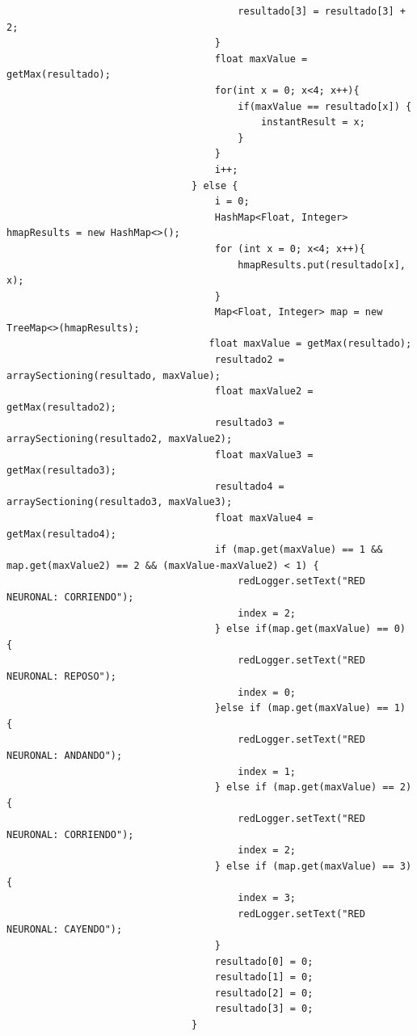\documentclass[12pt]{book}
\numberwithin{equation}{section}
\begin{document}
\begin{appendices}
\begin{verbatim}
                                        resultado[3] = resultado[3] + 2;
                                    }
                                    float maxValue = getMax(resultado);
                                    for(int x = 0; x<4; x++){
                                        if(maxValue == resultado[x]) {
                                            instantResult = x;
                                        }
                                    }
                                    i++;
                                } else {
                                    i = 0;
                                    HashMap<Float, Integer> hmapResults = new HashMap<>();
                                    for (int x = 0; x<4; x++){
                                        hmapResults.put(resultado[x], x);
                                    }
                                    Map<Float, Integer> map = new TreeMap<>(hmapResults);
                                   float maxValue = getMax(resultado);
                                    resultado2 = arraySectioning(resultado, maxValue);
                                    float maxValue2 = getMax(resultado2);
                                    resultado3 = arraySectioning(resultado2, maxValue2);
                                    float maxValue3 = getMax(resultado3);
                                    resultado4 = arraySectioning(resultado3, maxValue3);
                                    float maxValue4 = getMax(resultado4);
                                    if (map.get(maxValue) == 1 && map.get(maxValue2) == 2 && (maxValue-maxValue2) < 1) {
                                        redLogger.setText("RED NEURONAL: CORRIENDO");
                                        index = 2;
                                    } else if(map.get(maxValue) == 0) {
                                        redLogger.setText("RED NEURONAL: REPOSO");
                                        index = 0;
                                    }else if (map.get(maxValue) == 1) {
                                        redLogger.setText("RED NEURONAL: ANDANDO");
                                        index = 1;
                                    } else if (map.get(maxValue) == 2){
                                        redLogger.setText("RED NEURONAL: CORRIENDO");
                                        index = 2;
                                    } else if (map.get(maxValue) == 3) {
                                        index = 3;
                                        redLogger.setText("RED NEURONAL: CAYENDO");
                                    }
                                    resultado[0] = 0;
                                    resultado[1] = 0;
                                    resultado[2] = 0;
                                    resultado[3] = 0;
                                }


\end{verbatim}
\end{appendices}
\end{document}
